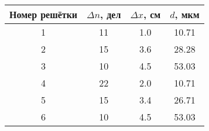 \begin{tabular}{cccc}
\toprule
Номер решётки & $\Delta n$, дел & $\Delta x$, см & $d$, мкм \\
\midrule
1 & 11 & 1.0 & 10.71 \\
2 & 15 & 3.6 & 28.28 \\
3 & 10 & 4.5 & 53.03 \\
4 & 22 & 2.0 & 10.71 \\
5 & 15 & 3.4 & 26.71 \\
6 & 10 & 4.5 & 53.03 \\
\bottomrule
\end{tabular}

